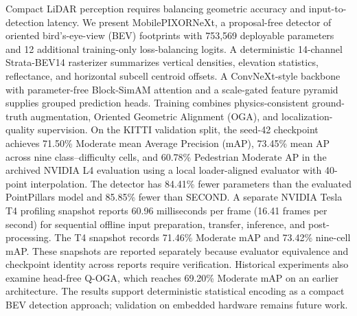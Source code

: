Compact LiDAR perception requires balancing geometric accuracy and input-to-detection latency. We present MobilePIXORNeXt, a proposal-free detector of oriented bird's-eye-view (BEV) footprints with 753,569 deployable parameters and 12 additional training-only loss-balancing logits. A deterministic 14-channel Strata-BEV14 rasterizer summarizes vertical densities, elevation statistics, reflectance, and horizontal subcell centroid offsets. A ConvNeXt-style backbone with parameter-free Block-SimAM attention and a scale-gated feature pyramid supplies grouped prediction heads. Training combines physics-consistent ground-truth augmentation, Oriented Geometric Alignment (OGA), and localization-quality supervision. On the KITTI validation split, the seed-42 checkpoint achieves 71.50\% Moderate mean Average Precision (mAP), 73.45\% mean AP across nine class--difficulty cells, and 60.78\% Pedestrian Moderate AP in the archived NVIDIA L4 evaluation using a local loader-aligned evaluator with 40-point interpolation. The detector has 84.41\% fewer parameters than the evaluated PointPillars model and 85.85\% fewer than SECOND. A separate NVIDIA Tesla T4 profiling snapshot reports 60.96 milliseconds per frame (16.41 frames per second) for sequential offline input preparation, transfer, inference, and post-processing. The T4 snapshot records 71.46\% Moderate mAP and 73.42\% nine-cell mAP. These snapshots are reported separately because evaluator equivalence and checkpoint identity across reports require verification. Historical experiments also examine head-free Q-OGA, which reaches 69.20\% Moderate mAP on an earlier architecture. The results support deterministic statistical encoding as a compact BEV detection approach; validation on embedded hardware remains future work.
